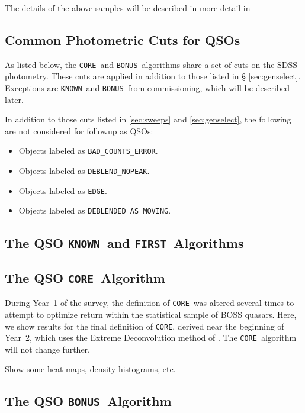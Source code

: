 \documentclass[12pt,preprint]{aastex}
\newcommand{\core}{\texttt{CORE}}
\newcommand{\bonus}{\texttt{BONUS}}
\newcommand{\known}{\texttt{KNOWN}}
\newcommand{\first}{\texttt{FIRST}}
\begin{document}
The details of the above samples will be described in more detail in


\subsection{Common Photometric Cuts for QSOs}

As listed below, the \core\ and \bonus\ algorithms share a set of cuts on the
SDSS photometry. These cuts are applied in addition to those listed in \S
\ref{sec:genselect}. Exceptions are \known\ and \bonus\ from commissioning,
which will be described later.

In addition to those cuts listed in \ref{sec:sweeps} and \ref{sec:genselect},
the following are not considered for followup as QSOs:

\begin{itemize}

    \item Objects labeled as \texttt{BAD\_COUNTS\_ERROR}.
    \item Objects labeled as \texttt{DEBLEND\_NOPEAK}.
    \item Objects labeled as \texttt{EDGE}.
    \item Objects labeled as \texttt{DEBLENDED\_AS\_MOVING}.

\end{itemize}

\subsection{The QSO \known\ and \first\ Algorithms} \label{sec:knownfirst}

\subsection{The QSO \core\ Algorithm}

During Year~1 of the survey, the definition of \core\ was altered several times
to attempt to optimize return within the statistical sample of BOSS quasars.
Here, we show results for the final definition of \core, derived near the
beginning of Year~2, which uses the Extreme Deconvolution method of
\citet{bovy11}.  The \core\ algorithm will not change further.

Show some heat maps, density histograms, etc.

\subsection{The QSO \bonus\ Algorithm}
\end{document}
